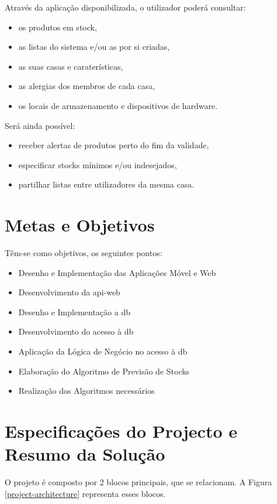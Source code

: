 Através da aplicação disponibilizada, o utilizador poderá consultar:
\begin{itemize} \itemsep 0pt
	\item os produtos em stock,
	\item as listas do sistema e/ou as por si criadas,
	\item as suas casas e caraterísticas,
	\item as alergias dos membros de cada casa,
	\item os locais de armazenamento e dispositivos de hardware.
\end{itemize}

Será ainda possível:
\begin{itemize} \itemsep 0pt
	\item receber alertas de produtos perto do fim da validade,
	\item especificar stocks mínimos e/ou indesejados,
	\item partilhar listas entre utilizadores da mesma casa.
\end{itemize}

%
%
\section{Metas e Objetivos} \label{sec12}
Têm-se como objetivos, os seguintes pontos:
\begin{itemize} \itemsep 0pt
	\item Desenho e Implementação das Aplicações Móvel e Web
	\item Desenvolvimento da \gls{api-web}
	\item Desenho e Implementação a \acrshort{db}
	\item Desenvolvimento do acesso à \acrshort{db}
	\item Aplicação da Lógica de Negócio no acesso à \acrshort{db}
	\item Elaboração do Algoritmo de Previsão de Stocks
	\item Realização dos Algoritmos necessários
\end{itemize}


%
%
\section{Especificações do Projecto e Resumo da Solução} \label{sec13}

O projeto é composto por 2 blocos principais, que se relacionam. A Figura \ref{project-architecture} representa esses blocos. 

